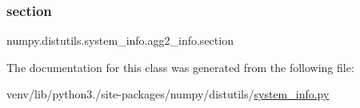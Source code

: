 \subsubsection{\texorpdfstring{section}{section}}
{\footnotesize\ttfamily numpy.\+distutils.\+system\+\_\+info.\+agg2\+\_\+info.\+section\hspace{0.3cm}{\ttfamily [static]}}



The documentation for this class was generated from the following file\+:\begin{DoxyCompactItemize}
\item 
venv/lib/python3./site-\/packages/numpy/distutils/\hyperlink{system__info_8py}{system\+\_\+info.\+py}\end{DoxyCompactItemize}
